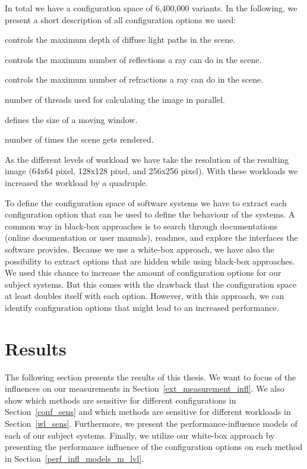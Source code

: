 In total we have a configuration space of 6,400,000 variants. In the following, we present a short description of all configuration options we used:


\begin{description}[style=multiline,leftmargin=11em]
	\item [DiffuseDepth] controls the maximum depth of diffuse light paths in the scene. 
	\item [ReflectionDepth] controls the maximum number of reflections a ray can do in the scene.
	\item [RefractionDepth] controls the maximum number of refractions a ray can do in the scene.
	\item [Threads] number of threads used for calculating the image in parallel.
	\item [BucketSize] defines the size of a moving window.
	\item [Samples] number of times the scene gets rendered.
\end{description}

As the different levels of workload we have take the resolution of the resulting image (64x64 pixel, 128x128 pixel, and 256x256 pixel). With these workloads we increased the workload by a quadruple. 

To define the configuration space of software systems we have to extract each configuration option that can be used to define the behaviour of the systems. A common way in black-box approaches is to search through documentations (online documentation or user manuals), readmes, and explore the interfaces the software provides. Because we use a white-box approach, we have also the possibility to extract options that are hidden while using black-box approaches. We used this chance to increase the amount of configuration options for our subject systems. But this comes with the drawback that the configuration space at least doubles itself with each option. However, with this approach, we can identify configuration options that might lead to an increased performance.



\section{Results}
\label{results}
The following section presents the results of this thesis. We want to focus of the influences on our measurements in Section~\ref{ext_measurement_infl}. We also show which methods are sensitive for different configurations in Section~\ref{conf_sens} and which methods are sensitive for different workloads in Section~\ref{wl_sens}. Furthermore, we present the performance-influence models of each of our subject systems. Finally, we utilize our white-box approach by presenting the performance influence of the configuration options on each method in Section~\ref{perf_infl_models_m_lvl}.

